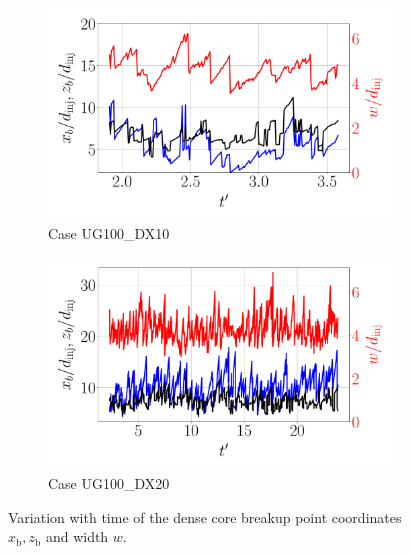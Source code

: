 \begin{figure}[ht]
\begin{subfigure}[b]{0.45\textwidth}
	\centering
   \includegraphics[scale=0.25]{./part2_developments/figures_ch5_resolved_JICF/results_dense_core_modeling/instant_xb_zb_w_UG100_DX10}
   \vspace*{-0.30in}
   \caption{Case UG100\_DX10}
   \label{fig:instant_xb_zb_w_UG100_DX10} 
\end{subfigure}
\hfill
\begin{subfigure}[b]{0.45\textwidth}
	\centering
   \includegraphics[scale=0.25]{./part2_developments/figures_ch5_resolved_JICF/results_dense_core_modeling/instant_xb_zb_w_UG100_DX20}
   \vspace*{-0.30in}
   \caption{Case UG100\_DX20}
   \label{fig:instant_xb_zb_w_UG100_DX20}
\end{subfigure}
   \caption{Variation with time of the dense core breakup point coordinates $x_\mathrm{b}, z_\mathrm{b}$ and width $w$.}

\label{fig:JICF_xb_zb_w_evolution}
\end{figure}


